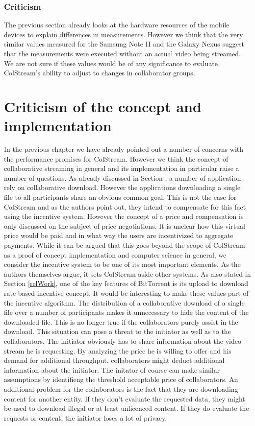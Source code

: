 \subsection{Criticism}
The previous section already looks at the hardware resources of the mobile devices to explain differences in measurements. However we think that the very similar values measured for the Samsung Note II and the Galaxy Nexus suggest that the measurements were executed without an actual video being streamed. We are not sure if these values would be of any significance to evaluate ColStream's ability to adjust to changes in collaborator groups.

\chapter{Criticism of the concept and implementation}
In the previous chapter we have already pointed out a number of concerns with the performance \cite{ColStream} promises for ColStream. However we think the concept of collaborative streaming in general and its implementation in particular raise a number of questions. As already discussed in Section \label{relWork}, a number of application rely on collaborative download. However the applications downloading a single file to all participants share an obvious common goal. This is not the case for ColStream and as the authors point out, they intend to compensate for this fact using the incentive system. However the concept of a price and compensation is only discussed on the subject of price negotiations. It is unclear how this virtual price would be paid and in what way the users are incentivized to aggregate payments. While it can be argued that this goes beyond the scope of ColStream as a proof of concept implementation and computer science in general, we consider the incentive system to be one of its most important elements. As the authors themselves argue, it sets ColStream aside other systems. As also stated in Section \ref{relWork}, one of the key features of BitTorrent is its upload to download rate based incentive concept. It would be interesting to make these values part of the incentive algorithm. The distribution of a collaborative download of a single file over a number of participants makes it unnecessary to hide the content of the downloaded file. This is no longer true if the collaborators purely assist in the download. This situation can pose a threat to the initiator as well as to the collaborators. The initiator obviously has to share information about the video stream he is requesting. By analyzing the price he is willing to offer and his demand for additional throughput, collaborators might deduct additional information about the initiator. The initator of course can make similar assumptions by identifieng the threshold acceptable price of collaborators. An additional problem for the collaborators is the fact that they are downloading content for another entity. If they don't evaluate the requested data, they might be used to download illegal or at least unlicenced content. If they do evaluate the requests or content, the initiator loses a lot of privacy.
